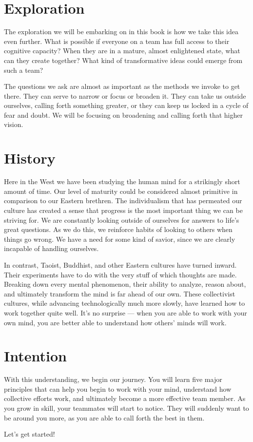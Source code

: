 \section{Exploration}

The exploration we will be embarking on in this book is how we take this idea even further. What is possible
if everyone on a team has full access to their cognitive capacity? When they are in a mature, almost
enlightened state, what can they create together? What kind of transformative ideas could emerge
from such a team?

The questions we ask are almost as important as the methods we invoke to get there. They can serve
to narrow or focus or broaden it. They can take us outside ourselves, calling forth something greater, or
they can keep us locked in a cycle of fear and doubt. We will be focusing on broadening and calling
forth that higher vision.

\section{History}

Here in the West we have been studying the human mind for a strikingly short amount of time. Our
level of maturity could be considered almost primitive in comparison to our Eastern brethren. The
individualism that has permeated our culture has created a sense that progress is the most important
thing we can be striving for. We are constantly looking outside of ourselves for answers to life's 
great questions. As we do this, we reinforce habits of looking to others when things go wrong. We
have a need for some kind of savior, since we are clearly incapable of handling ourselves.

In contrast, Taoist, Buddhist, and other Eastern cultures have turned inward. Their experiments have
to do with the very stuff of which thoughts are made. Breaking down every mental phenomenon, their 
ability to analyze, reason about, and ultimately transform the mind is far ahead of our own. These
collectivist cultures, while advancing technologically much more slowly, have learned how to work 
together quite well. It's no surprise --- when you are able to work with your own mind, you 
are better able to understand how others' minds will work.

\section{Intention}

With this understanding, we begin our journey. You will learn five major principles that can help
you begin to work with your mind, understand how collective efforts work, and ultimately become
a more effective team member. As you grow in skill, your teammates will start to notice. They will 
suddenly want to be around you more, as you are able to call forth the best in them.

Let's get started! 